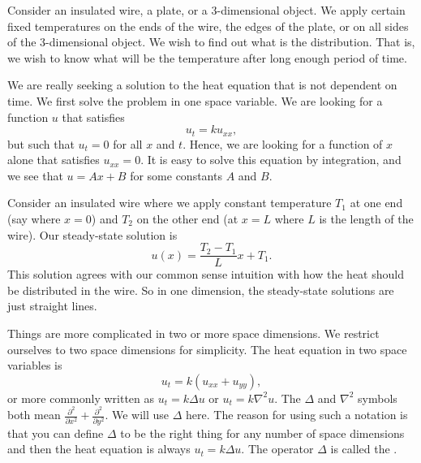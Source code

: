 
Consider an insulated wire, a plate, or a 3-dimensional object.
We apply
certain fixed temperatures on the ends of the wire, the edges of the plate,
or on all sides of the 3-dimensional object.  We wish to find out what is the
\emph{} distribution.  That is, we wish to know what will
be the temperature after long enough period of time.

We are really seeking a solution to the heat equation that is not
dependent on time.
We first solve the problem in one space variable.
We are looking for a function $u$ that satisfies
\begin{equation*}
u_t = k u_{xx} ,
\end{equation*}
but such that $u_t = 0$ for all $x$ and $t$.  Hence, we are looking for a
function of $x$ alone that satisfies $u_{xx} = 0$.  It is easy to solve this
equation by integration,
 and we see that $u = Ax+B$ for some constants $A$ and $B$.

Consider an insulated wire where we apply constant temperature $T_1$
at one end (say where $x=0$) and $T_2$ on the other end (at $x=L$ where $L$
is the length of the wire).  Our steady-state solution is
\begin{equation*}
u(x) = \frac{T_2-T_1}{L} x + T_1 .
\end{equation*}
This solution agrees with our common sense intuition with how the heat should be
distributed in the wire.  So in one dimension, the steady-state solutions
are just straight lines.

Things are more complicated in two or more space dimensions.
We restrict ourselves to two space dimensions for simplicity.
The heat equation in two
space variables is
\begin{equation} \label{dirich:heateq}
u_t = k(u_{xx} + u_{yy}) ,
\end{equation}
or more commonly written as
$u_t = k \Delta u$ or
$u_t = k \nabla^2 u$.  The $\Delta$ and $\nabla^2$ symbols
both mean $\frac{\partial^2}{\partial x^2} +
\frac{\partial^2}{\partial y^2}$.  We will use $\Delta$ here.
The reason for using such a notation is that you
can define $\Delta$ to be the right thing for any number of space
dimensions and then the heat equation is always
$u_t = k \Delta u$.  The operator $\Delta$ is called the \emph{}.

